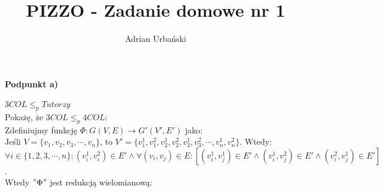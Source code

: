 \message{ !name(red.tex)}\documentclass{article}
\title{PIZZO - Zadanie domowe nr 1}
\author{Adrian Urbański}
\date{}
\begin{document}

\maketitle
\paragraph{Podpunkt a)}
$3COL\leq_{p}Tutorzy$ \\

Pokażę, że $3COL\leq_{p}4COL$:\\
Zdefiniujmy funkcję $\Phi:G(V,E) \rightarrow G'(V',E')$ jako:\\
Jeśli $V = \{v_{1}, v_{2}, v_{3}, \cdots, v_{n}\}$, to $V' =
\{v_{1}^{1},v_{1}^{2},v_{2}^{1},v_{2}^{2},v_{3}^{1},v_{3}^{2}, \cdots,
v_{n}^{1}, v_{n}^{2}\}$. Wtedy:\\
$\forall i \in \{1,2,3,\cdots,n\}:  (v_{i}^{1},v_{i}^{2})\in E' \wedge \forall
(v_{i}, v_{j})\in E: [ (v_{i}^{1},v_{j}^{1})\in E' \wedge (v_{i}^{1},
v_{j}^{2})\in E' \wedge (v_{i}^{2}, v_{j}^{1})\in E' ]$. \\
Wtedy $"\Phi"$ jest redukcją wielomianową:
\end{document}
